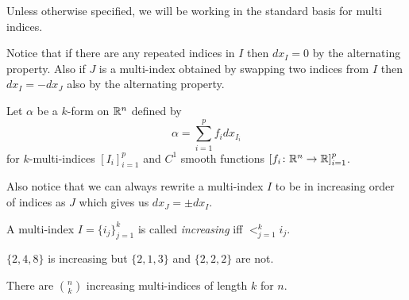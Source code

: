\documentclass[notes]{subfiles}
\begin{document}
Unless otherwise specified, we will be working in the standard basis for multi indices.

Notice that if there are any repeated indices in $I$ then $dx_I = 0$ by the alternating property. Also if $J$ is a multi-index obtained by swapping two indices from $I$ then $dx_I = -dx_J$ also by the alternating property.

\begin{example}
    Let $\alpha$ be a $k$-form on $\mathbb{R}^n$ defined by
    \[
        \alpha = \sum_{i = 1}^p f_i dx_{I_i}
    \]
    for $k$-multi-indices $[I_i]_{i = 1}^p$ and $C^1$ smooth functions $[f_i\colon \mathbb{R}^n \to \mathbb{R}]_{i = 1}^p$.
\end{example}

Also notice that we can always rewrite a multi-index $I$ to be in increasing order of indices as $J$ which gives us $dx_J = \pm dx_I$.

\begin{definition}
    A multi-index $I = \{ i_j \}_{j = 1}^k$ is called \textit{increasing} iff $\big<_{j = 1}^k i_j$.
\end{definition}

\begin{example}
    $\{ 2, 4, 8 \}$ is increasing but $\{ 2, 1, 3 \}$ and $\{ 2, 2, 2 \}$ are not.
\end{example}

\begin{lemma}
    There are ${n \choose k}$ increasing multi-indices of length $k$ for $n$.
\end{lemma}
\end{document}
